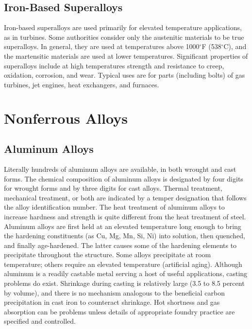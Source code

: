 \documentclass[
10pt,
a4paper,
openany,
svgnames,
]{book}
\begin{document}
\subsection{Iron-Based Superalloys}

Iron-based superalloys are used primarily for elevated temperature applications, as in turbines. Some authorities consider only the austenitic materials to be true superalloys. In general, they are used at temperatures above 1000$^{\circ}$F (538$^{\circ}$C), and the martensitic materials are used at lower temperatures. Significant properties of superalloys include at high temperatures strength and resistance to creep, oxidation, corrosion, and wear. Typical uses are for parts (including bolts) of gas turbines, jet engines, heat exchangers, and furnaces.

\section{Nonferrous Alloys}

\subsection{Aluminum Alloys}

Literally hundreds of aluminum alloys are available, in both wrought and cast forms. The chemical composition of aluminum alloys is designated by four digits for wrought forms and by three digits for cast alloys. Thermal treatment, mechanical treatment, or both are indicated by a temper designation that follows the alloy identification number. The heat treatment of aluminum alloys to increase hardness and strength is quite different from the heat treatment of steel. Aluminum alloys are first held at an elevated temperature long enough to bring the hardening constituents (as Cu, Mg, Mn, Si, Ni) into solution, then quenched, and finally age-hardened. The latter causes some of the hardening elements to precipitate throughout the structure. Some alloys precipitate at room temperature; others require an elevated temperature (artificial aging). Although aluminum is a readily castable metal serving a host of useful applications, casting problems do exist. Shrinkage during casting is relatively large (3.5 to 8.5 percent by volume), and there is no mechanism analogous to the beneficial carbon precipitation in cast iron to counteract shrinkage. Hot shortness and gas absorption can be problems unless details of appropriate foundry practice are specified and controlled.
\end{document}
